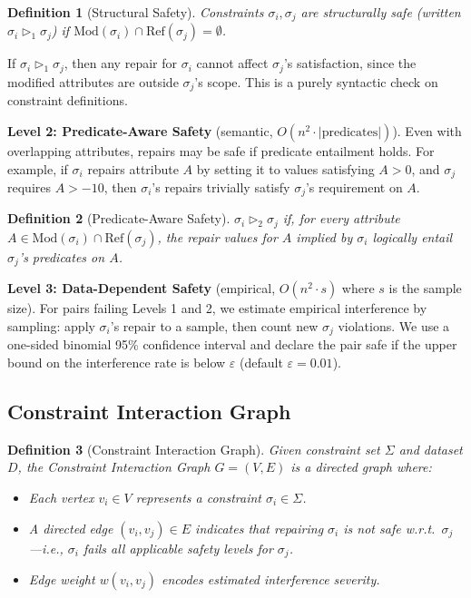 \documentclass{article}
\newtheorem{definition}{Definition}
\newcommand{\Modd}{\mathrm{Mod}}
\newcommand{\Reff}{\mathrm{Ref}}
\begin{document}
\begin{definition}[Structural Safety]
Constraints $\sigma_i, \sigma_j$ are \emph{structurally safe} (written $\sigma_i \triangleright_1 \sigma_j$) if $\Modd(\sigma_i) \cap \Reff(\sigma_j) = \emptyset$.
\end{definition}

If $\sigma_i \triangleright_1 \sigma_j$, then any repair for $\sigma_i$ cannot affect $\sigma_j$'s satisfaction, since the modified attributes are outside $\sigma_j$'s scope. This is a purely syntactic check on constraint definitions.

\textbf{Level 2: Predicate-Aware Safety} (semantic, $O(n^2 \cdot |\text{predicates}|)$).
Even with overlapping attributes, repairs may be safe if predicate entailment holds. For example, if $\sigma_i$ repairs attribute $A$ by setting it to values satisfying $A > 0$, and $\sigma_j$ requires $A > -10$, then $\sigma_i$'s repairs trivially satisfy $\sigma_j$'s requirement on $A$.

\begin{definition}[Predicate-Aware Safety]
$\sigma_i \triangleright_2 \sigma_j$ if, for every attribute $A \in \Modd(\sigma_i) \cap \Reff(\sigma_j)$, the repair values for $A$ implied by $\sigma_i$ logically entail $\sigma_j$'s predicates on $A$.
\end{definition}

\textbf{Level 3: Data-Dependent Safety} (empirical, $O(n^2 \cdot s)$ where $s$ is the sample size).
For pairs failing Levels 1 and 2, we estimate empirical interference by sampling: apply $\sigma_i$'s repair to a sample, then count new $\sigma_j$ violations. We use a one-sided binomial 95\% confidence interval and declare the pair safe if the upper bound on the interference rate is below $\varepsilon$ (default $\varepsilon = 0.01$).

\subsection{Constraint Interaction Graph}
\label{sec:cig}

\begin{definition}[Constraint Interaction Graph]
Given constraint set $\Sigma$ and dataset $D$, the \emph{Constraint Interaction Graph} $G = (V, E)$ is a directed graph where:
\begin{itemize}
  \item Each vertex $v_i \in V$ represents a constraint $\sigma_i \in \Sigma$.
  \item A directed edge $(v_i, v_j) \in E$ indicates that repairing $\sigma_i$ is \emph{not safe} w.r.t.\ $\sigma_j$---i.e., $\sigma_i$ fails all applicable safety levels for $\sigma_j$.
  \item Edge weight $w(v_i, v_j)$ encodes estimated interference severity.
\end{itemize}
\end{definition}
\end{document}
